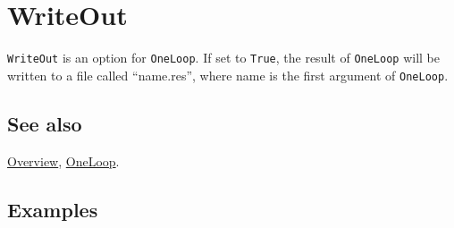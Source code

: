 \documentclass[../FeynCalcManual.tex]{subfiles}
\begin{document}
\hypertarget{writeout}{%
\section{WriteOut}\label{writeout}}

\texttt{WriteOut} is an option for \texttt{OneLoop}. If set to
\texttt{True}, the result of \texttt{OneLoop} will be written to a file
called ``name.res'', where name is the first argument of
\texttt{OneLoop}.

\subsection{See also}

\hyperlink{toc}{Overview}, \hyperlink{oneloop}{OneLoop}.

\subsection{Examples}
\end{document}
